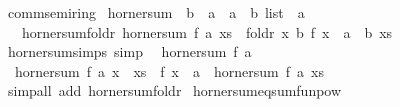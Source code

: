 \begin{isabellebody}
%
\endisatagproof
{\isafoldproof}%
%
\isadelimproof
%
\endisadelimproof
%
\isadelimdocument
%
\endisadelimdocument
%
\isatagdocument
%
\isamarkuptrue%
%
\endisatagdocument
{\isafolddocument}%
%
\isadelimdocument
%
\endisadelimdocument
{}\isamarkupfalse%
\ comm{\isacharunderscore}{\kern0pt}semiring{\isacharunderscore}{\kern0pt}{}\isanewline
{}\isanewline
\isanewline
{}\isamarkupfalse%
\ horner{\isacharunderscore}{\kern0pt}sum\ {\isacharcolon}{\kern0pt}{\isacharcolon}{\kern0pt}\ {\isacartoucheopen}{\isacharparenleft}{\kern0pt}{\isacharprime}{\kern0pt}b\ {\isasymRightarrow}\ {\isacharprime}{\kern0pt}a{\isacharparenright}{\kern0pt}\ {\isasymRightarrow}\ {\isacharprime}{\kern0pt}a\ {\isasymRightarrow}\ {\isacharprime}{\kern0pt}b\ list\ {\isasymRightarrow}\ {\isacharprime}{\kern0pt}a{\isacartoucheclose}\isanewline
\ \ \ horner{\isacharunderscore}{\kern0pt}sum{\isacharunderscore}{\kern0pt}foldr{\isacharcolon}{\kern0pt}\ {\isacartoucheopen}horner{\isacharunderscore}{\kern0pt}sum\ f\ a\ xs\ {\isacharequal}{\kern0pt}\ foldr\ {\isacharparenleft}{\kern0pt}{\isasymlambda}x\ b{\isachardot}{\kern0pt}\ f\ x\ {\isacharplus}{\kern0pt}\ a\ {\isacharasterisk}{\kern0pt}\ b{\isacharparenright}{\kern0pt}\ xs\ {}{\isacartoucheclose}\isanewline
\isanewline
{}\isamarkupfalse%
\ horner{\isacharunderscore}{\kern0pt}sum{\isacharunderscore}{\kern0pt}simps\ {\isacharbrackleft}{\kern0pt}simp{\isacharbrackright}{\kern0pt}{\isacharcolon}{\kern0pt}\isanewline
\ \ {\isacartoucheopen}horner{\isacharunderscore}{\kern0pt}sum\ f\ a\ {\isacharbrackleft}{\kern0pt}{\isacharbrackright}{\kern0pt}\ {\isacharequal}{\kern0pt}\ {}{\isacartoucheclose}\isanewline
\ \ {\isacartoucheopen}horner{\isacharunderscore}{\kern0pt}sum\ f\ a\ {\isacharparenleft}{\kern0pt}x\ {\isacharhash}{\kern0pt}\ xs{\isacharparenright}{\kern0pt}\ {\isacharequal}{\kern0pt}\ f\ x\ {\isacharplus}{\kern0pt}\ a\ {\isacharasterisk}{\kern0pt}\ horner{\isacharunderscore}{\kern0pt}sum\ f\ a\ xs{\isacartoucheclose}\isanewline
%
\isadelimproof
\ \ %
\endisadelimproof
%
\isatagproof
{}\isamarkupfalse%
\ {\isacharparenleft}{\kern0pt}simp{\isacharunderscore}{\kern0pt}all\ add{\isacharcolon}{\kern0pt}\ horner{\isacharunderscore}{\kern0pt}sum{\isacharunderscore}{\kern0pt}foldr{\isacharparenright}{\kern0pt}%
\endisatagproof
{\isafoldproof}%
%
\isadelimproof
\isanewline
%
\endisadelimproof
\isanewline
{}\isamarkupfalse%
\ horner{\isacharunderscore}{\kern0pt}sum{\isacharunderscore}{\kern0pt}eq{\isacharunderscore}{\kern0pt}sum{\isacharunderscore}{\kern0pt}funpow{\isacharcolon}{\kern0pt}\isanewline

\end{isabellebody}
